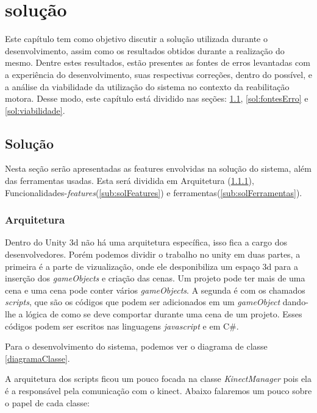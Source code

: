 \chapter[Solução]{solução}
  Este capítulo tem como objetivo discutir a solução utilizada durante o
desenvolvimento, assim como os resultados obtidos durante a realização do mesmo. Dentre estes
resultados, estão presentes as fontes de erros levantadas com a experiência do desenvolvimento,
suas respectivas correções, dentro do possível, e a análise da viabilidade da utilização do
sistema no contexto da reabilitação motora. Desse modo, este
capítulo está dividido nas seções: \ref{sol:solucao}, \ref{sol:fontesErro} e \ref{sol:viabilidade}.

\section{Solução}\label{sol:solucao}
  Nesta seção serão apresentadas as features envolvidas na solução do sistema,
além das ferramentas usadas. Esta será dividida em Arquitetura (\ref{sub:arquitetura}), Funcionalidades-\textit{features}(\ref{sub:solFeatures}) e
ferramentas(\ref{sub:solFerramentas}).

\subsection{Arquitetura}\label{sub:arquitetura}
  Dentro do Unity 3d não há uma arquitetura específica, isso fica a cargo dos desenvolvedores. Porém podemos dividir o trabalho no unity em duas partes,
a primeira é a parte de vizualização, onde ele desponibiliza um espaço 3d para a inserção dos \textit{gameObjects} e criação das cenas. Um projeto pode
ter mais de uma cena e uma cena pode conter vários \textit{gameObjects}. A segunda é com os chamados \textit{scripts}, que são os códigos que podem
ser adicionados em um \textit{gameObject} dando-lhe a lógica de como se deve comportar durante uma cena de um projeto. Esses códigos podem ser escritos
nas linguagens \textit{javascript} e em C\#.

  Para o desenvolvimento do sistema, podemos ver o diagrama de classe \ref{diagramaClasse}.

  A arquitetura dos scripts ficou um pouco focada na classe \textit{KinectManager} pois ela é a responsável pela comunicação com o kinect.
Abaixo falaremos um pouco sobre o papel de cada classe:

